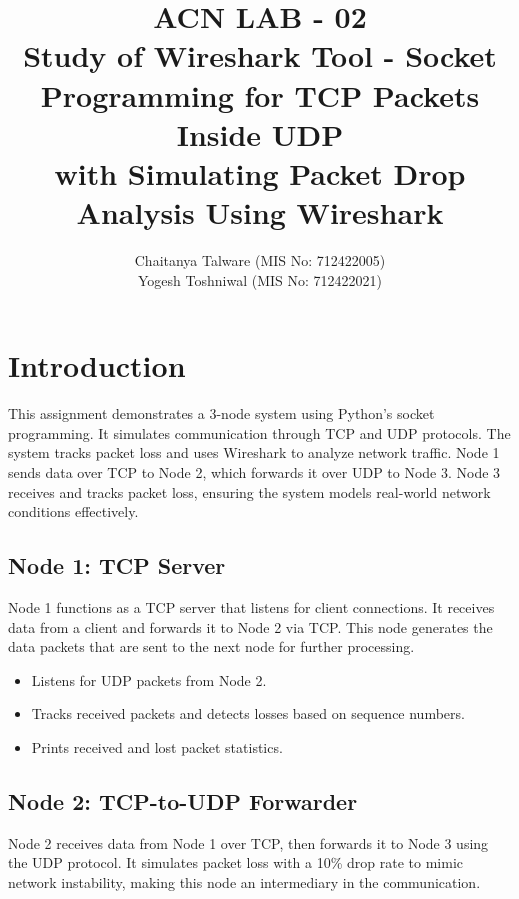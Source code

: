 \documentclass{article}
\begin{document}
\title{ACN LAB - 02 \\ Study of Wireshark Tool - Socket Programming for TCP Packets Inside UDP \\ with Simulating Packet Drop Analysis Using Wireshark}
\author{Chaitanya Talware (MIS No: 712422005) \\ Yogesh Toshniwal (MIS No: 712422021)}
\maketitle



\section{Introduction}
This assignment demonstrates a 3-node system using Python’s socket programming. It simulates communication through TCP and UDP protocols. The system tracks packet loss and uses Wireshark to analyze network traffic. Node 1 sends data over TCP to Node 2, which forwards it over UDP to Node 3. Node 3 receives and tracks packet loss, ensuring the system models real-world network conditions effectively.
\subsection{Node 1: TCP Server}
Node 1 functions as a TCP server that listens for client connections. It receives data from a client and forwards it to Node 2 via TCP. This node generates the data packets that are sent to the next node for further processing.

\begin{itemize}
    \item Listens for UDP packets from Node 2.
    \item Tracks received packets and detects losses based on sequence numbers.
    \item Prints received and lost packet statistics.
\end{itemize}
\subsection{Node 2: TCP-to-UDP Forwarder}
Node 2 receives data from Node 1 over TCP, then forwards it to Node 3 using the UDP protocol. It simulates packet loss with a 10\% drop rate to mimic network instability, making this node an intermediary in the communication.
\end{document}
